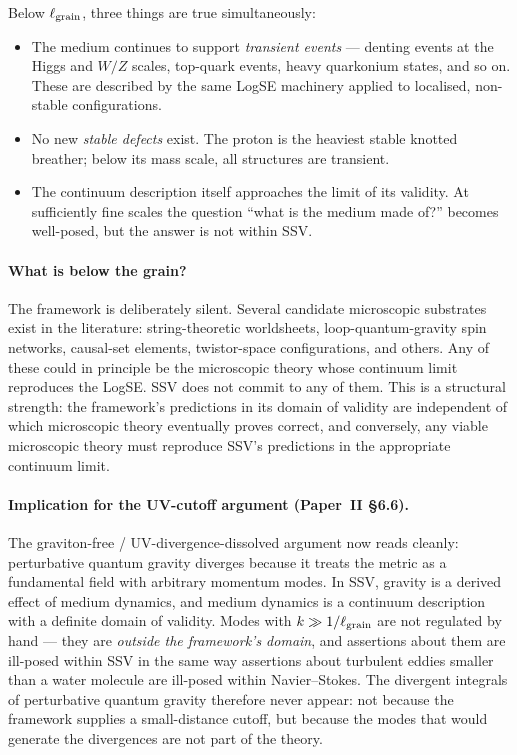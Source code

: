 \documentclass[11pt,a4paper]{article}
\begin{document}
Below $\ell_{\rm grain}$, three things are true simultaneously:
\begin{itemize}
\item The medium continues to support \emph{transient events} ---
      denting events at the Higgs and $W/Z$ scales, top-quark events,
      heavy quarkonium states, and so on.  These are described by the
      same LogSE machinery applied to localised, non-stable
      configurations.
\item No new \emph{stable defects} exist.  The proton is the heaviest
      stable knotted breather; below its mass scale, all structures
      are transient.
\item The continuum description itself approaches the limit of its
      validity.  At sufficiently fine scales the question ``what is
      the medium made of?'' becomes well-posed, but the answer is not
      within SSV.
\end{itemize}

\paragraph{What is below the grain?}
The framework is deliberately silent.  Several candidate microscopic
substrates exist in the literature: string-theoretic worldsheets,
loop-quantum-gravity spin networks, causal-set elements, twistor-space
configurations, and others.  Any of these could in principle be the
microscopic theory whose continuum limit reproduces the LogSE.  SSV
does not commit to any of them.  This is a structural strength: the
framework's predictions in its domain of validity are independent of
which microscopic theory eventually proves correct, and conversely, any
viable microscopic theory must reproduce SSV's predictions in the
appropriate continuum limit.

\paragraph{Implication for the UV-cutoff argument (Paper~II \S6.6).}
The graviton-free / UV-divergence-dissolved argument now reads cleanly:
perturbative quantum gravity diverges because it treats the metric as
a fundamental field with arbitrary momentum modes.  In SSV, gravity is
a derived effect of medium dynamics, and medium dynamics is a continuum
description with a definite domain of validity.  Modes with
$k \gg 1/\ell_{\rm grain}$ are not regulated by hand --- they are
\emph{outside the framework's domain}, and assertions about them are
ill-posed within SSV in the same way assertions about turbulent
eddies smaller than a water molecule are ill-posed within
Navier--Stokes.  The divergent integrals of perturbative quantum
gravity therefore never appear: not because the framework supplies a
small-distance cutoff, but because the modes that would generate the
divergences are not part of the theory.
\end{document}
